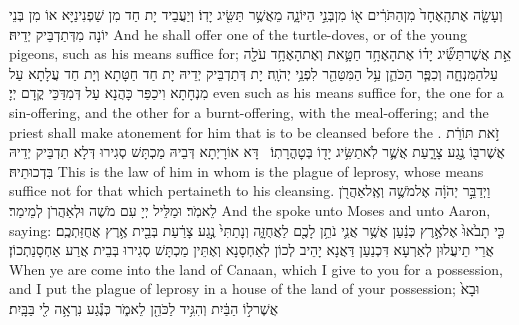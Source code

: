 {וְעָשָׂ֤ה אֶת\maqqaf הָֽאֶחָד֙ מִן\maqqaf הַתֹּרִ֔ים א֖וֹ מִן\maqqaf בְּנֵ֣י הַיּוֹנָ֑ה מֵאֲשֶׁ֥ר תַּשִּׂ֖יג יָדֽוֹ׃}
{וְיַעֲבֵיד יָת חַד מִן שַׁפְנִינַיָּא אוֹ מִן בְּנֵי יוֹנָה מִדְּתַדְבֵּיק יְדֵיהּ׃}
{And he shall offer one of the turtle-doves, or of the young pigeons, such as his means suffice for;}{}
{אֵ֣ת אֲשֶׁר\maqqaf תַּשִּׂ֞יג יָד֗וֹ אֶת\maqqaf הָאֶחָ֥ד חַטָּ֛את וְאֶת\maqqaf הָאֶחָ֥ד עֹלָ֖ה עַל\maqqaf הַמִּנְחָ֑ה וְכִפֶּ֧ר הַכֹּהֵ֛ן עַ֥ל הַמִּטַּהֵ֖ר לִפְנֵ֥י יְהֹוָֽה׃}
{יָת דְּתַדְבֵּיק יְדֵיהּ יָת חַד חַטָּתָא וְיָת חַד עֲלָתָא עַל מִנְחָתָא וִיכַפַּר כָּהֲנָא עַל דְּמִדַּכֵּי קֳדָם יְיָ׃}
{even such as his means suffice for, the one for a sin-offering, and the other for a burnt-offering, with the meal-offering; and the priest shall make atonement for him that is to be cleansed before the \lord.}{}
{זֹ֣את תּוֹרַ֔ת אֲשֶׁר\maqqaf בּ֖וֹ נֶ֣גַע צָרָ֑עַת אֲשֶׁ֛ר לֹֽא\maqqaf תַשִּׂ֥יג יָד֖וֹ בְּטׇהֳרָתֽוֹ׃ \petucha }
{דָּא אוֹרָיְתָא דְּבֵיהּ מַכְתָּשׁ סְגִירוּ דְּלָא תַדְבֵּיק יְדֵיהּ בִּדְכוּתֵיהּ׃}
{This is the law of him in whom is the plague of leprosy, whose means suffice not for that which pertaineth to his cleansing.}{}
{וַיְדַבֵּ֣ר יְהֹוָ֔ה אֶל\maqqaf מֹשֶׁ֥ה וְאֶֽל\maqqaf אַהֲרֹ֖ן לֵאמֹֽר׃}
{וּמַלֵּיל יְיָ עִם מֹשֶׁה וּלְאַהֲרֹן לְמֵימַר׃}
{And the \lord\space spoke unto Moses and unto Aaron, saying:}{}
{כִּ֤י תָבֹ֙אוּ֙ אֶל\maqqaf אֶ֣רֶץ כְּנַ֔עַן אֲשֶׁ֥ר אֲנִ֛י נֹתֵ֥ן לָכֶ֖ם לַאֲחֻזָּ֑ה וְנָתַתִּי֙ נֶ֣גַע צָרַ֔עַת בְּבֵ֖ית אֶ֥רֶץ אֲחֻזַּתְכֶֽם׃}
{אֲרֵי תֵיעֲלוּן לְאַרְעָא דִּכְנַעַן דַּאֲנָא יָהֵיב לְכוֹן לְאַחְסָנָא וְאֶתֵּין מַכְתָּשׁ סְגִירוּ בְּבֵית אֲרַע אַחְסָנַתְכוֹן׃}
{When ye are come into the land of Canaan, which I give to you for a possession, and I put the plague of leprosy in a house of the land of your possession;}{}
{וּבָא֙ אֲשֶׁר\maqqaf ל֣וֹ הַבַּ֔יִת וְהִגִּ֥יד לַכֹּהֵ֖ן לֵאמֹ֑ר כְּנֶ֕גַע נִרְאָ֥ה לִ֖י בַּבָּֽיִת׃}
